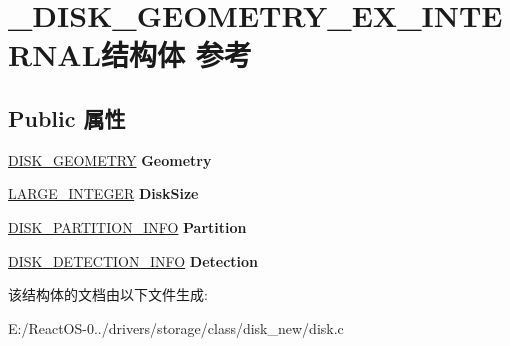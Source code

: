\hypertarget{struct___d_i_s_k___g_e_o_m_e_t_r_y___e_x___i_n_t_e_r_n_a_l}{}\section{\+\_\+\+D\+I\+S\+K\+\_\+\+G\+E\+O\+M\+E\+T\+R\+Y\+\_\+\+E\+X\+\_\+\+I\+N\+T\+E\+R\+N\+A\+L结构体 参考}
\label{struct___d_i_s_k___g_e_o_m_e_t_r_y___e_x___i_n_t_e_r_n_a_l}
\subsection*{Public 属性}
\begin{DoxyCompactItemize}
\item 
\mbox{\label{struct___d_i_s_k___g_e_o_m_e_t_r_y___e_x___i_n_t_e_r_n_a_l_ae20a8a5f3a0ce7212091da6322dd77c5}} 
\hyperlink{struct___d_i_s_k___g_e_o_m_e_t_r_y}{D\+I\+S\+K\+\_\+\+G\+E\+O\+M\+E\+T\+RY} {\bfseries Geometry}
\item 
\mbox{\label{struct___d_i_s_k___g_e_o_m_e_t_r_y___e_x___i_n_t_e_r_n_a_l_a078935b69c14610bbcddaf1318ea1ab6}} 
\hyperlink{union___l_a_r_g_e___i_n_t_e_g_e_r}{L\+A\+R\+G\+E\+\_\+\+I\+N\+T\+E\+G\+ER} {\bfseries Disk\+Size}
\item 
\mbox{\label{struct___d_i_s_k___g_e_o_m_e_t_r_y___e_x___i_n_t_e_r_n_a_l_a1df7e823e7e6c4bb2ffb348e60b518d2}} 
\hyperlink{struct___d_i_s_k___p_a_r_t_i_t_i_o_n___i_n_f_o}{D\+I\+S\+K\+\_\+\+P\+A\+R\+T\+I\+T\+I\+O\+N\+\_\+\+I\+N\+FO} {\bfseries Partition}
\item 
\mbox{\label{struct___d_i_s_k___g_e_o_m_e_t_r_y___e_x___i_n_t_e_r_n_a_l_ae7241f7c3a12b0361e033bcb323b2428}} 
\hyperlink{struct___d_i_s_k___d_e_t_e_c_t_i_o_n___i_n_f_o}{D\+I\+S\+K\+\_\+\+D\+E\+T\+E\+C\+T\+I\+O\+N\+\_\+\+I\+N\+FO} {\bfseries Detection}
\end{DoxyCompactItemize}


该结构体的文档由以下文件生成\+:\begin{DoxyCompactItemize}
\item 
E\+:/\+React\+O\+S-\/0../drivers/storage/class/disk\+\_\+new/disk.\+c\end{DoxyCompactItemize}
